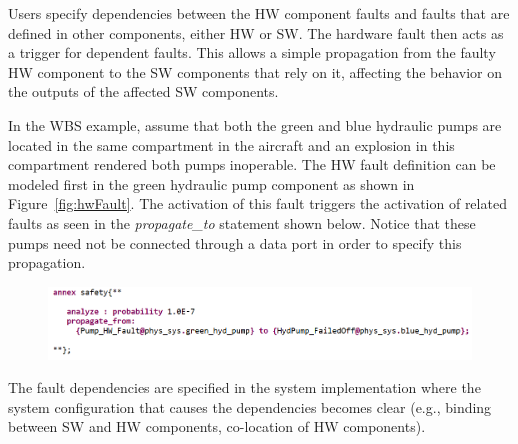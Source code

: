 Users specify dependencies between the HW component faults and faults that are defined in other components, either HW or SW. The hardware fault then acts as a trigger for dependent faults. This allows a simple propagation from the faulty HW component to the SW components that rely on it, affecting the behavior on the outputs of the affected SW components.

In the WBS example, assume that both the green and blue hydraulic pumps are located in the same compartment in the aircraft and an explosion in this compartment rendered both pumps inoperable.
The HW fault definition can be modeled first in the green hydraulic pump component as shown in Figure~\ref{fig:hwFault}. The activation of this fault triggers the activation of related faults as seen in the \textit{propagate\_to} statement shown below. %
Notice that these pumps need not be connected through a data port in order to specify this propagation. %

\begin{figure}[h!]
	\vspace{-0.1in}
	\begin{center}
		\includegraphics[width=1.0\textwidth]{images/hw_prop_stmt.png}
	\end{center}
	\vspace{-0.3in}
	\label{fig:hwFaultProp}
\end{figure}

The fault dependencies are specified in the system implementation where the system configuration that causes the dependencies becomes clear (e.g., binding between SW and HW components, co-location of HW components). 



